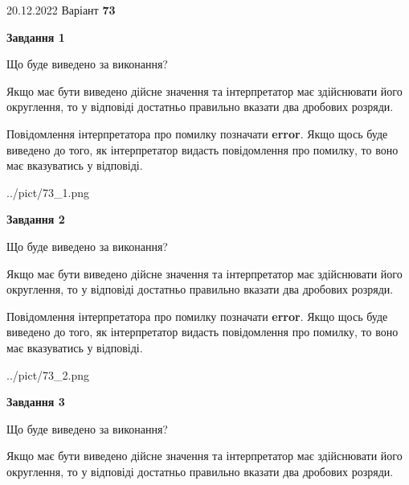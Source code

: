 \documentclass[12pt, ukrainian]{article}
\begin{document}
{20.12.2022 Варіант \No \textbf { 73 }\par}
{
\begin {Large}

{\begin {center}\textbf{Завдання 1}\end {center}}\par
Що буде виведено за виконання? \par

Якщо має бути виведено дійсне значення та інтерпретатор має здійснювати його округлення, 
то у відповіді достатньо правильно вказати два дробових розряди.

Повідомлення інтерпретатора про помилку позначати \textbf{error}.
Якщо щось буде виведено до того, як інтерпретатор видасть повідомлення про помилку, 
то воно має вказуватись у відповіді. \par

\begin{center}
	{../pict/73_1.png}
\end{center}
\newpage

{\begin {center}\textbf{Завдання 2}\end {center}}\par
Що буде виведено за виконання? \par

Якщо має бути виведено дійсне значення та інтерпретатор має здійснювати його округлення, 
то у відповіді достатньо правильно вказати два дробових розряди.

Повідомлення інтерпретатора про помилку позначати \textbf{error}.
Якщо щось буде виведено до того, як інтерпретатор видасть повідомлення про помилку, 
то воно має вказуватись у відповіді. \par

\begin{center}
	{../pict/73_2.png}
\end{center}
\newpage

{\begin {center}\textbf{Завдання 3}\end {center}}\par
Що буде виведено за виконання? \par

Якщо має бути виведено дійсне значення та інтерпретатор має здійснювати його округлення, 
то у відповіді достатньо правильно вказати два дробових розряди.


\end{Large}}
\end{document}
